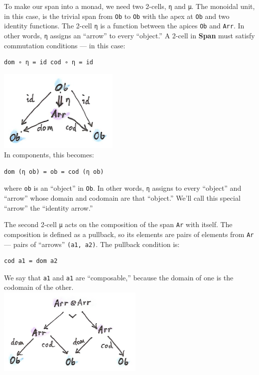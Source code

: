 To make our span into a monad, we need two 2-cells, \texttt{η} and
\texttt{μ}. The monoidal unit, in this case, is the trivial span from
\texttt{Ob} to \texttt{Ob} with the apex at \texttt{Ob} and two identity
functions. The 2-cell \texttt{η} is a function between the apices
\texttt{Ob} and \texttt{Arr}. In other words, \texttt{η} assigns an
``arrow'' to every ``object.'' A 2-cell in \textbf{Span} must satisfy
commutation conditions --- in this case:

\begin{verbatim}
dom ∘ η = id cod ∘ η = id
\end{verbatim}

\includegraphics[width=2.27083in]{images/spanunit.png}\\
In components, this becomes:

\begin{verbatim}
dom (η ob) = ob = cod (η ob)
\end{verbatim}

where \texttt{ob} is an ``object'' in \texttt{Ob}. In other words,
\texttt{η} assigns to every ``object'' and ``arrow'' whose domain and
codomain are that ``object.'' We'll call this special ``arrow'' the
``identity arrow.''

The second 2-cell \texttt{μ} acts on the composition of the span
\texttt{Ar} with itself. The composition is defined as a pullback, so
its elements are pairs of elements from \texttt{Ar} --- pairs of
``arrows'' \texttt{(a1,\ a2)}. The pullback condition is:

\begin{verbatim}
cod a1 = dom a2
\end{verbatim}

We say that \texttt{a1} and \texttt{a1} are ``composable,'' because the
domain of one is the codomain of the other.\\
\includegraphics[width=2.75000in]{images/spanmul.png}

